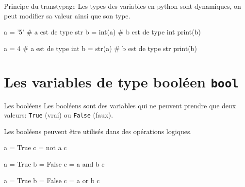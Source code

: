 \begin{easybox}{Principe du transtypage}{}
    Les types des variables en python sont dynamiques, on peut modifier sa valeur ainsi que son type.
    
    \begin{minipage}[t]{0.48\linewidth}
        \begin{ConsolePythontex}[TaillePolice=\normalsize, Label=false]{}
            a = '5'     # a est de type str
            b = int(a)  # b est de type int
            print(b)
        \end{ConsolePythontex}
    \end{minipage}\hfill
    \begin{minipage}[t]{0.48\linewidth}
		\begin{ConsolePythontex}[TaillePolice=\normalsize, Label=false]{}
            a = 4       # a est de type int
            b = str(a)  # b est de type str
            print(b)
        \end{ConsolePythontex}
    \end{minipage}
    
    \end{easybox}

    \section{Les variables de type booléen \texttt{bool}}

    
\begin{easybox}{Les booléens}{}
    \smallskip
    Les booléens sont des variables qui ne peuvent prendre que deux valeurs: \verb+True+ (vrai) ou \verb+False+ (faux).
    
    \smallskip
    Les booléens peuvent être utilisés dans des opérations logiques.
    
	\medskip

    \begin{minipage}{0.32\linewidth}
         \begin{ConsolePythontex}[TaillePolice=\normalsize, Label=false]{}
a = True
c = not a
c
        \end{ConsolePythontex}
        
    \end{minipage}\hfill
    \begin{minipage}{0.32\linewidth}
        \begin{ConsolePythontex}[TaillePolice=\normalsize, Label=false]{}
a = True
b = False
c = a and b
c
        \end{ConsolePythontex}
    \end{minipage}\hfill
    \begin{minipage}{0.32\linewidth}
       
        \begin{ConsolePythontex}[TaillePolice=\normalsize, Label=false]{}
a = True
b = False
c = a or b
c
        \end{ConsolePythontex}
    \end{minipage}    
\end{easybox}

